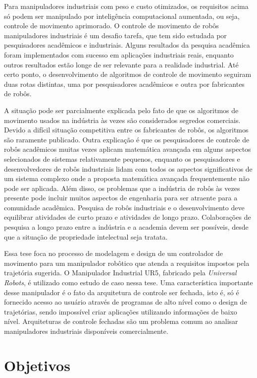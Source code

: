 Para manipuladores industriais com peso e custo otimizados, os requisitos acima só podem ser manipulado por inteligência computacional aumentada, ou seja, controle de movimento aprimorado. O controle de movimento de robôs manipuladores industriais é um desafio
tarefa, que tem sido estudada por pesquisadores acadêmicos e industriais. Alguns resultados da pesquisa acadêmica foram implementados com sucesso em aplicações industriais reais, enquanto outros resultados estão longe
de ser relevante para a realidade industrial. Até certo ponto, o desenvolvimento de algoritmos de controle de movimento seguiram duas rotas distintas, uma por pesquisadores acadêmicos e outra por fabricantes de robôs.


A situação pode ser parcialmente explicada pelo fato de que os algoritmos de movimento usados na indústria às vezes são considerados segredos comerciais. Devido a difícil situação competitiva entre os fabricantes de robôs, os algoritmos são
raramente publicado. Outra explicação é que os pesquisadores de controle de robôs acadêmicos muitas vezes aplicam matemática avançada em alguns aspectos selecionados de sistemas relativamente pequenos, enquanto os pesquisadores e desenvolvedores de robôs industriais lidam com todos os aspectos significativos de um sistema complexo onde a proposta matemática avançada frequentemente não pode ser aplicada. Além disso, os problemas que
a indústria de robôs às vezes presente pode incluir muitos aspectos de engenharia para ser atraente para a comunidade acadêmica. Pesquisa de robôs industriais e
o desenvolvimento deve equilibrar atividades de curto prazo e atividades de longo prazo. Colaborações de pesquisa a longo prazo entre a indústria e a academia devem ser possíveis, desde que a situação de propriedade intelectual seja tratata. 

Essa tese foca no processo de modelagem e design de um controlador de movimento para um manipulador robôtico que atenda a requisitos impostos pela trajetória sugerida.  O Manipulador Industrial UR5, fabricado pela \emph{Universal Robots},
é utilizado como estudo de caso nessa tese. Uma característica importante desse manipulador é o fato da arquitetura de controle ser fechada, isto é,  só é fornecido acesso ao usuário através de programas de alto nível como o design de trajetórias, sendo impossível criar aplicações utilizando informações de baixo nível. Arquiteturas de controle fechadas são um problema comum ao analisar manipuladores industriais disponíveis comercialmente. 

\section{Objetivos}
